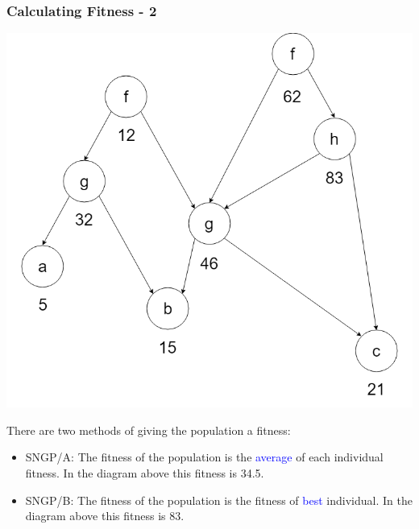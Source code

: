 \documentclass{beamer}
\newcommand{\blue}[1]{\textcolor{blue}{#1}}
\begin{document}
		\begin{frame}
			\frametitle{Calculating Fitness - 2}
			
			\begin{center}
				
				\includegraphics[scale=0.2]{resources/11_sngp_fitness}
				
				
			\end{center}
			
			There are two methods of giving the population a fitness:
			
			\begin{itemize}
				\item SNGP/A: The fitness of the population is the \blue{average} of each individual fitness. In the diagram above this fitness is 34.5.
				\item SNGP/B: The fitness of the population is the fitness of \blue{best} individual. In the diagram above this fitness is 83.
			\end{itemize}
				
	
		\end{frame}
	
\end{document}

